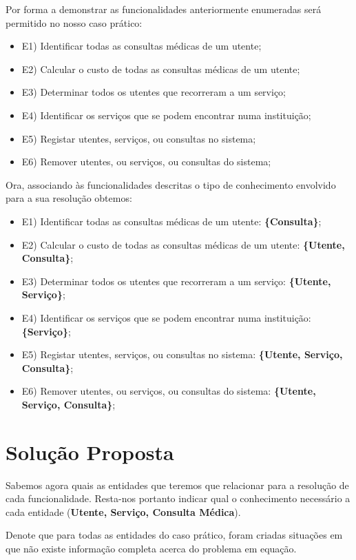 \documentclass[
  oneside,
  10pt, a4paper,
  footinclude=true,
  headinclude=true,
  cleardoublepage=empty
]{scrbook}
\begin{document}
Por forma a demonstrar as funcionalidades anteriormente enumeradas será permitido no nosso caso prático:
\begin{itemize}
\item E1) Identificar todas as consultas médicas de um utente;
\item E2) Calcular o custo de todas as consultas médicas de um utente;
\item E3) Determinar todos os utentes que recorreram a um serviço;
\item E4) Identificar os serviços que se podem encontrar numa instituição;
\item E5) Registar utentes, serviços, ou consultas no sistema;
\item E6) Remover utentes, ou serviços, ou consultas do sistema;
\end{itemize}


Ora, associando às funcionalidades descritas o tipo de conhecimento envolvido para a sua resolução obtemos:

\begin{itemize}
\item E1) Identificar todas as consultas médicas de um utente: \textbf{\{Consulta\}};
\item E2) Calcular o custo de todas as consultas médicas de um utente: \textbf{\{Utente, Consulta\}};
\item E3) Determinar todos os utentes que recorreram a um serviço: \textbf{\{Utente, Serviço\}};
\item E4) Identificar os serviços que se podem encontrar numa instituição: \textbf{\{Serviço\}};
\item E5) Registar utentes, serviços, ou consultas no sistema: \textbf{\{Utente, Serviço, Consulta\}};
\item E6) Remover utentes, ou serviços, ou consultas do sistema: \textbf{\{Utente, Serviço, Consulta\}};
\end{itemize}



\chapter{Solução Proposta}

Sabemos agora quais as entidades que teremos que relacionar para a resolução de cada funcionalidade. Resta-nos portanto indicar qual o conhecimento necessário a cada entidade (\textbf{Utente, Serviço, Consulta Médica}).\par 
Denote que para todas as entidades do caso prático, foram criadas situações em que não existe informação completa acerca do problema em equação.
\end{document}
